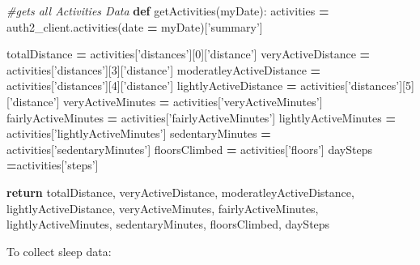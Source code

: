 \documentclass[]{book}
\newenvironment{Shaded}{\begin{snugshade}}{\end{snugshade}}
\newcommand{\KeywordTok}[1]{\textcolor[rgb]{0.13,0.29,0.53}{\textbf{#1}}}
\newcommand{\DecValTok}[1]{\textcolor[rgb]{0.00,0.00,0.81}{#1}}
\newcommand{\StringTok}[1]{\textcolor[rgb]{0.31,0.60,0.02}{#1}}
\newcommand{\CommentTok}[1]{\textcolor[rgb]{0.56,0.35,0.01}{\textit{#1}}}
\newcommand{\ControlFlowTok}[1]{\textcolor[rgb]{0.13,0.29,0.53}{\textbf{#1}}}
\newcommand{\OperatorTok}[1]{\textcolor[rgb]{0.81,0.36,0.00}{\textbf{#1}}}
\newcommand{\NormalTok}[1]{#1}
\begin{document}
\begin{Shaded}
\begin{Highlighting}[]
\CommentTok{#gets all Activities Data}
\KeywordTok{def}\NormalTok{ getActivities(myDate): }
\NormalTok{    activities }\OperatorTok{=}\NormalTok{ auth2_client.activities(date }\OperatorTok{=}\NormalTok{ myDate)[}\StringTok{'summary'}\NormalTok{]}

\NormalTok{    totalDistance }\OperatorTok{=}\NormalTok{ activities[}\StringTok{'distances'}\NormalTok{][}\DecValTok{0}\NormalTok{][}\StringTok{'distance'}\NormalTok{]}
\NormalTok{    veryActiveDistance }\OperatorTok{=}\NormalTok{ activities[}\StringTok{'distances'}\NormalTok{][}\DecValTok{3}\NormalTok{][}\StringTok{'distance'}\NormalTok{]}
\NormalTok{    moderatleyActiveDistance }\OperatorTok{=}\NormalTok{ activities[}\StringTok{'distances'}\NormalTok{][}\DecValTok{4}\NormalTok{][}\StringTok{'distance'}\NormalTok{]}
\NormalTok{    lightlyActiveDistance }\OperatorTok{=}\NormalTok{ activities[}\StringTok{'distances'}\NormalTok{][}\DecValTok{5}\NormalTok{][}\StringTok{'distance'}\NormalTok{]}
\NormalTok{    veryActiveMinutes }\OperatorTok{=}\NormalTok{ activities[}\StringTok{'veryActiveMinutes'}\NormalTok{]}
\NormalTok{    fairlyActiveMinutes }\OperatorTok{=}\NormalTok{ activities[}\StringTok{'fairlyActiveMinutes'}\NormalTok{]}
\NormalTok{    lightlyActiveMinutes }\OperatorTok{=}\NormalTok{ activities[}\StringTok{'lightlyActiveMinutes'}\NormalTok{]}
\NormalTok{    sedentaryMinutes }\OperatorTok{=}\NormalTok{ activities[}\StringTok{'sedentaryMinutes'}\NormalTok{]}
\NormalTok{    floorsClimbed }\OperatorTok{=}\NormalTok{ activities[}\StringTok{'floors'}\NormalTok{]}
\NormalTok{    daySteps }\OperatorTok{=}\NormalTok{activities[}\StringTok{'steps'}\NormalTok{]}
    
    \ControlFlowTok{return}\NormalTok{ totalDistance, veryActiveDistance, moderatleyActiveDistance, lightlyActiveDistance,   veryActiveMinutes, fairlyActiveMinutes, lightlyActiveMinutes, sedentaryMinutes, floorsClimbed, daySteps}
\end{Highlighting}
\end{Shaded}

To collect sleep data:
\end{document}
